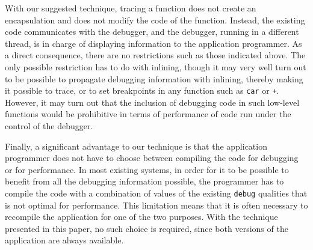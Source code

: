 With our suggested technique, tracing a function does not create an
encapsulation and does not modify the code of the function.  Instead,
the existing code communicates with the debugger, and the debugger,
running in a different thread, is in charge of displaying information
to the application programmer.  As a direct consequence, there are no
restrictions such as those indicated above.  The only possible
restriction has to do with inlining, though it may very well turn out
to be possible to propagate debugging information with inlining,
thereby making it possible to trace, or to set breakpoints in any
function such as \texttt{car} or \texttt{+}.  However, it may turn out
that the inclusion of debugging code in such low-level functions would be
prohibitive in terms of performance of code run under the control of
the debugger.

Finally, a significant advantage to our technique is that the
application programmer does not have to choose between compiling the
code for debugging or for performance.  In most existing systems, in
order for it to be possible to benefit from all the debugging
information possible, the programmer has to compile the code with a
combination of values of the existing \texttt{debug} qualities that is
not optimal for performance.  This limitation means that it is often
necessary to recompile the application for one of the two purposes.
With the technique presented in this paper, no such choice is
required, since both versions of the application are always
available.
